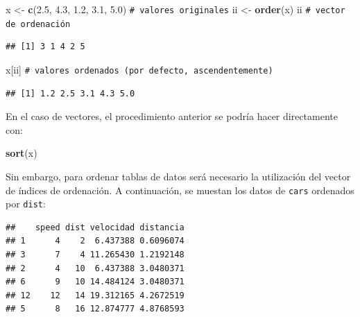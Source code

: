 \documentclass[
]{book}
\newenvironment{Shaded}{\begin{snugshade}}{\end{snugshade}}
\newcommand{\CommentTok}[1]{\textcolor[rgb]{0.56,0.35,0.01}{\textit{#1}}}
\newcommand{\FloatTok}[1]{\textcolor[rgb]{0.00,0.00,0.81}{#1}}
\newcommand{\FunctionTok}[1]{\textcolor[rgb]{0.13,0.29,0.53}{\textbf{#1}}}
\newcommand{\NormalTok}[1]{#1}
\newcommand{\OtherTok}[1]{\textcolor[rgb]{0.56,0.35,0.01}{#1}}
\newcommand{\SpecialCharTok}[1]{\textcolor[rgb]{0.81,0.36,0.00}{\textbf{#1}}}
\theoremstyle{break}
\theoremstyle{nonumberplain}
\renewcommand{\CommentTok}[1]{\textcolor[rgb]{0.41,0.41,0.41}{\texttt{#1}}}
\begin{document}
\begin{Shaded}
\begin{Highlighting}[]
\NormalTok{x }\OtherTok{\textless{}{-}} \FunctionTok{c}\NormalTok{(}\FloatTok{2.5}\NormalTok{, }\FloatTok{4.3}\NormalTok{, }\FloatTok{1.2}\NormalTok{, }\FloatTok{3.1}\NormalTok{, }\FloatTok{5.0}\NormalTok{) }\CommentTok{\# valores originales}
\NormalTok{ii }\OtherTok{\textless{}{-}} \FunctionTok{order}\NormalTok{(x)}
\NormalTok{ii    }\CommentTok{\# vector de ordenación}
\end{Highlighting}
\end{Shaded}

\begin{verbatim}
## [1] 3 1 4 2 5
\end{verbatim}

\begin{Shaded}
\begin{Highlighting}[]
\NormalTok{x[ii] }\CommentTok{\# valores ordenados (por defecto, ascendentemente)}
\end{Highlighting}
\end{Shaded}

\begin{verbatim}
## [1] 1.2 2.5 3.1 4.3 5.0
\end{verbatim}

En el caso de vectores, el procedimiento anterior se podría
hacer directamente con:

\begin{Shaded}
\begin{Highlighting}[]
\FunctionTok{sort}\NormalTok{(x)}
\end{Highlighting}
\end{Shaded}

Sin embargo, para ordenar tablas de datos será necesario la utilización del
vector de índices de ordenación. A continuación, se muestan los datos de \texttt{cars} ordenados por \texttt{dist}:

\begin{Shaded}
\end{Shaded}

\begin{verbatim}
##    speed dist velocidad distancia
## 1      4    2  6.437388 0.6096074
## 3      7    4 11.265430 1.2192148
## 2      4   10  6.437388 3.0480371
## 6      9   10 14.484124 3.0480371
## 12    12   14 19.312165 4.2672519
## 5      8   16 12.874777 4.8768593
\end{verbatim}
\end{document}
